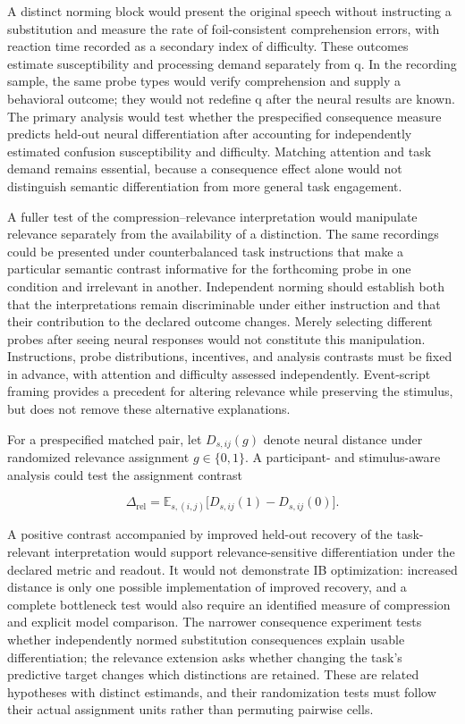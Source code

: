 \documentclass[11pt]{article}
\begin{document}
A distinct norming block would present the original speech without
instructing a substitution and measure the rate of foil-consistent
comprehension errors, with reaction time recorded as a secondary index
of difficulty. These outcomes estimate susceptibility and processing
demand separately from q. In the recording sample, the same probe types
would verify comprehension and supply a behavioral outcome; they would
not redefine q after the neural results are known. The primary analysis
would test whether the prespecified consequence measure predicts
held-out neural differentiation after accounting for independently
estimated confusion susceptibility and difficulty. Matching attention
and task demand remains essential, because a consequence effect alone
would not distinguish semantic differentiation from more general task
engagement.

A fuller test of the compression--relevance interpretation would
manipulate relevance separately from the availability of a distinction.
The same recordings could be presented under counterbalanced task
instructions that make a particular semantic contrast informative for
the forthcoming probe in one condition and irrelevant in another.
Independent norming should establish both that the interpretations
remain discriminable under either instruction and that their
contribution to the declared outcome changes. Merely selecting different
probes after seeing neural responses would not constitute this
manipulation. Instructions, probe distributions, incentives, and
analysis contrasts must be fixed in advance, with attention and
difficulty assessed independently. Event-script framing provides a
precedent for altering relevance while preserving the stimulus, but does
not remove these alternative explanations.

For a prespecified matched pair, let \(D_{s,ij}(g)\) denote neural
distance under randomized relevance assignment \(g\in\{0,1\}\). A
participant- and stimulus-aware analysis could test the assignment
contrast

\begin{equation}
\Delta_{\mathrm{rel}}=\mathbb E_{s,(i,j)}
\big[D_{s,ij}(1)-D_{s,ij}(0)\big].
\end{equation}

A positive contrast accompanied by improved held-out recovery of the
task-relevant interpretation would support relevance-sensitive
differentiation under the declared metric and readout. It would not
demonstrate IB optimization: increased distance is only one possible
implementation of improved recovery, and a complete bottleneck test
would also require an identified measure of compression and explicit
model comparison. The narrower consequence experiment tests whether
independently normed substitution consequences explain usable
differentiation; the relevance extension asks whether changing the
task's predictive target changes which distinctions are retained. These
are related hypotheses with distinct estimands, and their randomization
tests must follow their actual assignment units rather than permuting
pairwise cells.
\end{document}

